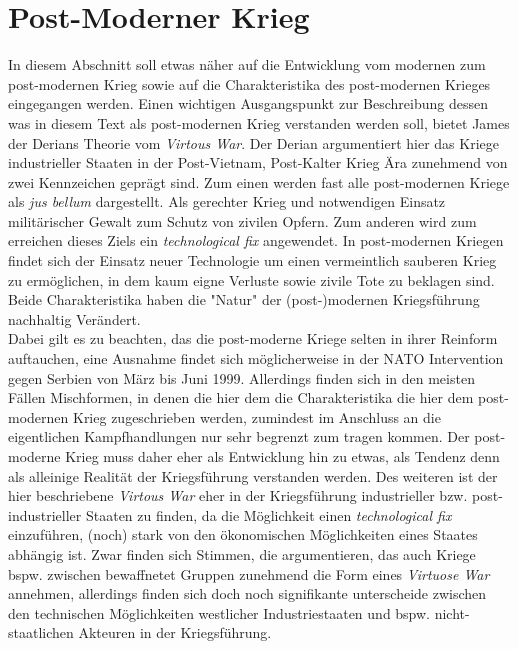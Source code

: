 \documentclass[11pt,a4paper,oneside,numbers=noenddot,bibliography=totocnumbered,DIV=13]{scrartcl}
\begin{document}
\section{Post-Moderner Krieg}
In diesem Abschnitt soll etwas näher auf die Entwicklung vom modernen zum post-modernen Krieg sowie auf die Charakteristika des post-modernen Krieges   eingegangen werden. Einen wichtigen Ausgangspunkt zur Beschreibung dessen was in diesem Text als post-modernen Krieg verstanden werden soll, bietet James der Derians Theorie vom \textit{Virtous War}. Der Derian argumentiert hier das Kriege industrieller Staaten in der Post-Vietnam, Post-Kalter Krieg Ära zunehmend von zwei Kennzeichen geprägt sind. Zum einen werden fast alle post-modernen Kriege als \textit{jus bellum} dargestellt. Als gerechter Krieg und notwendigen Einsatz militärischer Gewalt zum Schutz von zivilen Opfern. Zum anderen wird zum erreichen dieses Ziels ein \textit{technological fix} angewendet. In post-modernen Kriegen findet sich der Einsatz neuer Technologie um einen vermeintlich sauberen Krieg zu ermöglichen, in dem kaum eigne Verluste sowie zivile Tote zu beklagen sind. Beide Charakteristika haben die "Natur" der (post-)modernen Kriegsführung nachhaltig Verändert.\cite{DerDerian2001} \\
Dabei gilt es zu beachten, das die post-moderne Kriege selten in ihrer Reinform auftauchen, eine Ausnahme findet sich möglicherweise in der NATO Intervention gegen Serbien von März bis Juni 1999. Allerdings finden sich in den meisten Fällen Mischformen, in denen die hier dem die Charakteristika die hier dem post-modernen Krieg zugeschrieben werden, zumindest im Anschluss an die eigentlichen Kampfhandlungen nur sehr begrenzt zum tragen kommen. Der post-moderne Krieg muss daher eher als Entwicklung hin zu etwas, als Tendenz denn als alleinige Realität der Kriegsführung verstanden werden. Des weiteren ist der hier beschriebene \textit{Virtous War} eher in der Kriegsführung industrieller bzw. post-industrieller Staaten zu finden, da die Möglichkeit einen \textit{technological fix} einzuführen, (noch) stark von den ökonomischen Möglichkeiten eines Staates abhängig ist. Zwar finden sich Stimmen, die argumentieren, das auch Kriege bspw. zwischen bewaffnetet Gruppen zunehmend die Form eines \textit{Virtuose War} annehmen, allerdings finden sich doch noch signifikante unterscheide zwischen den technischen Möglichkeiten westlicher Industriestaaten und bspw. nicht-staatlichen Akteuren in der Kriegsführung.\\ 
\end{document}
